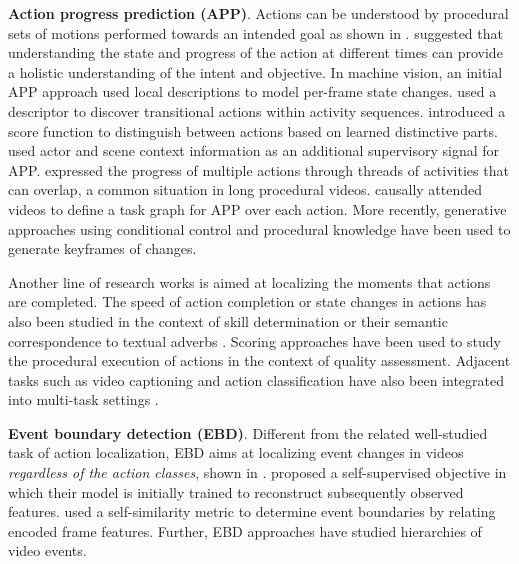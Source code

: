 \noindent
\textbf{Action progress prediction (APP)}. Actions can be understood by procedural sets of motions performed towards an intended goal as shown in . \citet{vaina1991object} suggested that understanding the state and progress of the action at different times can provide a holistic understanding of the intent and objective. In machine vision, an initial APP approach \citep{fathi2013modeling} used local descriptions to model per-frame state changes. \citep{kataoka2016recognition} used a descriptor to discover transitional actions within activity sequences. \citet{xiong2017pursuit} introduced a score function to distinguish between actions based on learned distinctive parts. \citet{becattini2020done} used actor and scene context information as an additional supervisory signal for APP. \citet{price2022unweavenet} expressed the progress of multiple actions through threads of activities that can overlap, a common situation in long procedural videos. \citet{shen2024progress} causally attended videos to define a task graph for APP over each action. More recently, generative approaches \citep{damen2024genhowto} using conditional control \citep{zhang2023adding} and procedural knowledge \citep{ashutosh2023video,zhou2023procedure} have been used to generate keyframes of changes. 

Another line of research works \citep{heidarivincheh2016beyond,heidarivincheh2018action} is aimed at localizing the moments that actions are completed. The speed of action completion or state changes in actions has also been studied in the context of skill determination \citep{doughty2018s} or their semantic correspondence to textual adverbs \citep{doughty2020action,doughty2022you,moltisanti2023learning}. Scoring approaches \citep{tang2020uncertainty} have been used to study the procedural execution of actions in the context of quality assessment. Adjacent tasks such as video captioning and action classification have also been integrated into multi-task settings \citep{parmar2019and}.


\noindent
\textbf{Event boundary detection (EBD)}. Different from the related well-studied task of action localization, EBD \citep{shou2021generic} aims at localizing event changes in videos \emph{regardless of the action classes}, shown in . \citet{aakur2019perceptual} proposed a self-supervised objective in which their model is initially trained to reconstruct subsequently observed features. \citep{shou2021generic} used a self-similarity metric to determine event boundaries by relating encoded frame features. Further, EBD approaches \citep{mounir2023streamer} have studied hierarchies of video events.


